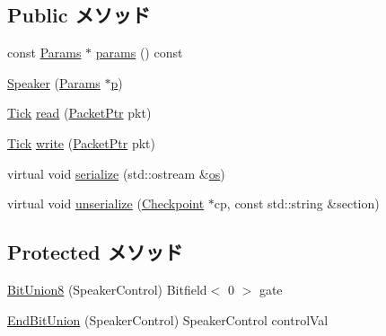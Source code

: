 \subsection*{Public メソッド}
\begin{DoxyCompactItemize}
\item 
const \hyperlink{classX86ISA_1_1Speaker_ae21f9523ca3e32b9fd40e1e647ebd365}{Params} $\ast$ \hyperlink{classX86ISA_1_1Speaker_acd3c3feb78ae7a8f88fe0f110a718dff}{params} () const 
\item 
\hyperlink{classX86ISA_1_1Speaker_ab5b969b360baf10e8afbe38ca5e18b59}{Speaker} (\hyperlink{classX86ISA_1_1Speaker_ae21f9523ca3e32b9fd40e1e647ebd365}{Params} $\ast$\hyperlink{namespaceX86ISA_af675c1d542a25b96e11164b80809a856}{p})
\item 
\hyperlink{base_2types_8hh_a5c8ed81b7d238c9083e1037ba6d61643}{Tick} \hyperlink{classX86ISA_1_1Speaker_a613ec7d5e1ec64f8d21fec78ae8e568e}{read} (\hyperlink{classPacket}{PacketPtr} pkt)
\item 
\hyperlink{base_2types_8hh_a5c8ed81b7d238c9083e1037ba6d61643}{Tick} \hyperlink{classX86ISA_1_1Speaker_a4cefab464e72b5dd42c003a0a4341802}{write} (\hyperlink{classPacket}{PacketPtr} pkt)
\item 
virtual void \hyperlink{classX86ISA_1_1Speaker_a53e036786d17361be4c7320d39c99b84}{serialize} (std::ostream \&\hyperlink{namespaceX86ISA_a6b6e6ba763e7eaf46ac5b6372ca98d30}{os})
\item 
virtual void \hyperlink{classX86ISA_1_1Speaker_af22e5d6d660b97db37003ac61ac4ee49}{unserialize} (\hyperlink{classCheckpoint}{Checkpoint} $\ast$cp, const std::string \&section)
\end{DoxyCompactItemize}
\subsection*{Protected メソッド}
\begin{DoxyCompactItemize}
\item 
\hyperlink{classX86ISA_1_1Speaker_a9dee9e496fb415ab25e4f3e1b9540783}{BitUnion8} (SpeakerControl) Bitfield$<$ 0 $>$ gate
\item 
\hyperlink{classX86ISA_1_1Speaker_ad12d02df1d565ee6a83773de872eaa0a}{EndBitUnion} (SpeakerControl) SpeakerControl controlVal
\end{DoxyCompactItemize}
